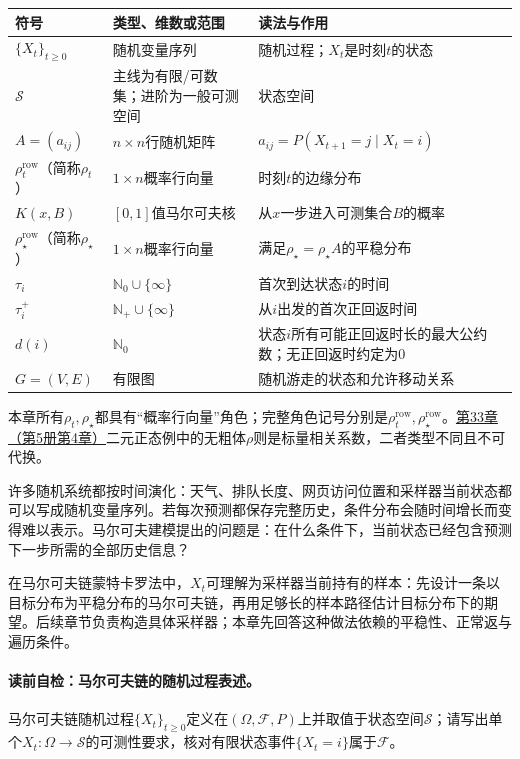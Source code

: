 \begin{symboltablebox}
\small
\begin{tabularx}{\linewidth}{@{}l l X@{}}
\toprule 符号 & 类型、维数或范围 & 读法与作用\\ \midrule
$\{X_t\}_{t\ge0}$ & 随机变量序列 & 随机过程；$X_t$是时刻$t$的状态\\
$\mathcal S$ & 主线为有限/可数集；进阶为一般可测空间 & 状态空间\\
$A=(a_{ij})$ & $n\times n$行随机矩阵 & $a_{ij}=P(X_{t+1}=j\mid X_t=i)$\\
$\rho_t^{\mathrm{row}}$（简称$\rho_t$） & $1\times n$概率行向量 & 时刻$t$的边缘分布\\
$K(x,B)$ & $[0,1]$值马尔可夫核 & 从$x$一步进入可测集合$B$的概率\\
$\rho_\star^{\mathrm{row}}$（简称$\rho_\star$） & $1\times n$概率行向量 & 满足$\rho_\star=\rho_\star A$的平稳分布\\
$\tau_i$ & $\mathbb N_0\cup\{\infty\}$ & 首次到达状态$i$的时间\\
$\tau_i^+$ & $\mathbb N_+\cup\{\infty\}$ & 从$i$出发的首次正回返时间\\
$d(i)$ & $\mathbb N_0$ & 状态$i$所有可能正回返时长的最大公约数；无正回返时约定为$0$\\
$G=(V,E)$ & 有限图 & 随机游走的状态和允许移动关系\\
\bottomrule
\end{tabularx}
\end{symboltablebox}
本章所有$\rho_t,\rho_\star$都具有“概率行向量”角色；完整角色记号分别是$\rho_t^{\mathrm{row}},\rho_\star^{\mathrm{row}}$。\hyperref[chap:V5-C04]{第33章（第5册第4章）}二元正态例中的无粗体$\rho$则是标量相关系数，二者类型不同且不可代换。

\label{struct:V5-C01-CH06}
许多随机系统都按时间演化：天气、排队长度、网页访问位置和采样器当前状态都可以写成随机变量序列。若每次预测都保存完整历史，条件分布会随时间增长而变得难以表示。马尔可夫建模提出的问题是：在什么条件下，当前状态已经包含预测下一步所需的全部历史信息？

在马尔可夫链蒙特卡罗法中，$X_t$可理解为采样器当前持有的样本：先设计一条以目标分布为平稳分布的马尔可夫链，再用足够长的样本路径估计目标分布下的期望。后续章节负责构造具体采样器；本章先回答这种做法依赖的平稳性、正常返与遍历条件。

\paragraph{读前自检：马尔可夫链的随机过程表述。}马尔可夫链随机过程$\{X_t\}_{t\ge0}$定义在$(\Omega,\mathcal F,P)$上并取值于状态空间$\mathcal S$；请写出单个$X_t:\Omega\to\mathcal S$的可测性要求，核对有限状态事件$\{X_t=i\}$属于$\mathcal F$。\par
